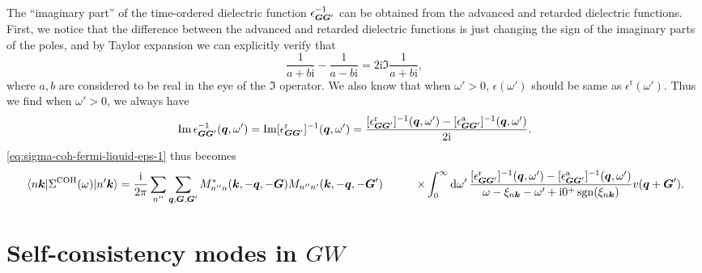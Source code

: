 \documentclass[hyperref, a4paper, 12pt]{report}
\DeclareMathOperator{\sgn}{sgn}
\newcommand*{\ii}{\mathrm{i}}
\def\\{}%
\begin{document}
The ``imaginary part'' of the time-ordered dielectric function $\epsilon_{\vb*{G} \vb*{G}'}^{-1}$
can be obtained from the advanced and retarded dielectric functions.
First, we notice that the difference between the advanced and retarded dielectric functions 
is just changing the sign of the imaginary parts of the poles, 
and by Taylor expansion we can explicitly verify that 
\[
    \frac{1}{a + b \ii}  - \frac{1}{a - b \ii}
    = 2 \ii \Im \frac{1}{a + b \ii}, 
\]
where $a, b$ are considered to be real in the eye of the $\Im$ operator.
We also know that when $\omega' > 0$, 
$\epsilon(\omega')$ should be same as $\epsilon^{\text{r}}(\omega')$.
Thus we find when $\omega' > 0$, 
we always have 
\begin{equation}
    \Im \epsilon^{-1}_{\vb*{G} \vb*{G}'}(\vb*{q}, \omega')
    = \Im [\epsilon^{\text{r}}_{\vb*{G} \vb*{G}'}]^{-1}(\vb*{q}, \omega')
    = \frac{[\epsilon^{\text{r}}_{\vb*{G} \vb*{G}'}]^{-1}(\vb*{q}, \omega') - 
    [\epsilon^{\text{a}}_{\vb*{G} \vb*{G}'}]^{-1}(\vb*{q}, \omega')}{2\ii}  .
\end{equation}
\eqref{eq:sigma-coh-fermi-liquid-eps-1} thus becomes 
\begin{equation}
    \begin{aligned}
        \mel{n \vb*{k}}{\Sigma^{\text{COH}}(\omega)}{n' \vb*{k}}
        &= \frac{\ii}{2\pi} \sum_{n''} \sum_{\vb*{q}, \vb*{G}, \vb*{G}'}
        M^*_{n'' n} (\vb*{k}, - \vb*{q}, - \vb*{G})  M_{n'' n'} (\vb*{k}, - \vb*{q},  -\vb*{G}') \\
        &\quad \quad \times \int_{0}^{\infty} \dd{\omega'} 
        \frac{
            [\epsilon^{\text{r}}_{\vb*{G} \vb*{G}'}]^{-1} (\vb*{q}, \omega')
            - [\epsilon^{\text{a}}_{\vb*{G} \vb*{G}'}]^{-1} (\vb*{q}, \omega') 
        }{\omega - \xi_{n \vb*{k}} - \omega' + \ii 0^+ \sgn(\xi_{n \vb*{k}})} v(\vb*{q}+\vb*{G}') .
    \end{aligned}
    \label{eq:ch-sum-final}
\end{equation}

\section{Self-consistency modes in $GW$}
\end{document}
